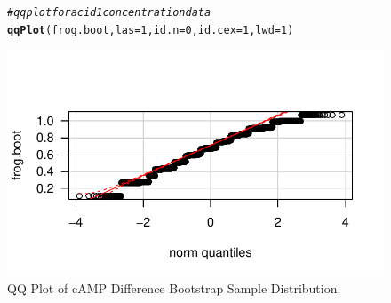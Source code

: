 \documentclass{article}\usepackage[]{graphicx}\usepackage[]{color}
\makeatletter
\def\maxwidth{ %
  \ifdim\Gin@nat@width>\linewidth
    \linewidth
  \else
    \Gin@nat@width
  \fi
}
\newcommand{\hlnum}[1]{\textcolor[rgb]{0.686,0.059,0.569}{#1}}%
\newcommand{\hlcom}[1]{\textcolor[rgb]{0.678,0.584,0.686}{\textit{#1}}}%
\newcommand{\hlstd}[1]{\textcolor[rgb]{0.345,0.345,0.345}{#1}}%
\newcommand{\hlkwc}[1]{\textcolor[rgb]{0.333,0.667,0.333}{#1}}%
\newcommand{\hlkwd}[1]{\textcolor[rgb]{0.737,0.353,0.396}{\textbf{#1}}}%
\newenvironment{kframe}{%
 \def\at@end@of@kframe{}%
 \ifinner\ifhmode%
  \def\at@end@of@kframe{\end{minipage}}%
  \begin{minipage}{\columnwidth}%
 \fi\fi%
 \def\FrameCommand##1{\hskip\@totalleftmargin \hskip-\fboxsep
 \colorbox{shadecolor}{##1}\hskip-\fboxsep
     \hskip-\linewidth \hskip-\@totalleftmargin \hskip\columnwidth}%
 \MakeFramed {\advance\hsize-\width
   \@totalleftmargin\z@ \linewidth\hsize
   \@setminipage}}%
 {\par\unskip\endMakeFramed%
 \at@end@of@kframe}
\newenvironment{knitrout}{}{} %
\makeatother
\begin{document}
\begin{figure}[H]  \begin{center}
\begin{knitrout}
\color{fgcolor}\begin{kframe}
\begin{alltt}
\hlcom{# qq plot for acid 1 concentration data}
\hlkwd{qqPlot}\hlstd{(frog.boot,} \hlkwc{las} \hlstd{=} \hlnum{1}\hlstd{,} \hlkwc{id.n} \hlstd{=} \hlnum{0}\hlstd{,} \hlkwc{id.cex} \hlstd{=} \hlnum{1}\hlstd{,} \hlkwc{lwd} \hlstd{=} \hlnum{1}\hlstd{)}
\end{alltt}
\end{kframe}
\includegraphics[width=\maxwidth]{figure/2_frog_qqbott} 

\end{knitrout}
\end{center}\caption{QQ Plot of cAMP Difference Bootstrap Sample Distribution.} \end{figure}
\end{document}
